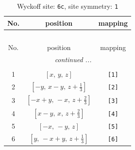 \documentclass[fleqn,8pt]{jsarticle}
\begin{document}
\renewcommand{\arraystretch}{1.2}
\begin{longtable}{ccc}
\caption{Wyckoff site: {\tt 6c}, site symmetry: {\tt 1}}
 \\
 \hline \hline
No. & position & mapping \\ \hline \endfirsthead

\multicolumn{2}{l}{\tablename\ \thetable{}} \\
 \hline \hline
No. & position & mapping \\ \hline \endhead

 \hline \hline
\multicolumn{2}{r}{\footnotesize\it continued ...} \\ \endfoot

 \hline \hline
\multicolumn{2}{r}{} \\ \endlastfoot

1 & $\left[ x,\, y,\, z \right]$ & {\tt [1]} \\ \hline
2 & $\left[ - y,\, x - y,\, z + \frac{1}{3} \right]$ & {\tt [2]} \\ \hline
3 & $\left[ - x + y,\, - x,\, z + \frac{2}{3} \right]$ & {\tt [3]} \\ \hline
4 & $\left[ x - y,\, x,\, z + \frac{2}{3} \right]$ & {\tt [4]} \\ \hline
5 & $\left[ - x,\, - y,\, z \right]$ & {\tt [5]} \\ \hline
6 & $\left[ y,\, - x + y,\, z + \frac{1}{3} \right]$ & {\tt [6]} \\
\end{longtable}
\end{document}
